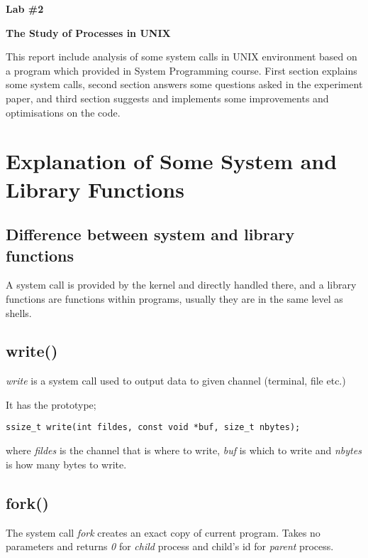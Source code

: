 \documentclass[11pt]{article}
\makeatletter
\renewenvironment{titlepage}
    {%
      \cleardoublepage
      \if@twocolumn
        \@restonecoltrue\onecolumn
      \else
        \@restonecolfalse\newpage
      \fi
      \thispagestyle{empty}%
    }%
    {\if@restonecol\twocolumn \else \newpage \fi
    }
\renewenvironment{titlepage}
    {%
      \cleardoublepage
      \if@twocolumn
        \@restonecoltrue\onecolumn
      \else
        \@restonecolfalse\newpage
      \fi
      \thispagestyle{empty}%
    }%
    {\if@restonecol\twocolumn \else \newpage \fi
     \if@twoside\else
     \fi
    }
\makeatother
\begin{document}
\begin{titlepage}
   \begin{center}
       \vspace*{5cm}
 
       \textbf{ \LARGE Lab \#2}
       
       \vspace{0.5cm}
 	\textbf{The Study of Processes in UNIX}
 	
       \vspace{0.5cm}
This report include analysis of some system calls in UNIX environment based on a program which provided in System Programming course. First section explains some system calls, second section answers some questions asked in the experiment paper, and third section suggests and implements some improvements and optimisations on the code.

 
   \end{center}
\end{titlepage}



\section*{Explanation of Some System and Library Functions}
\subsection*{Difference between system and library functions}
A system call is provided by the kernel and directly handled there, and a library functions are functions within programs, usually they are in the same level as shells.

\subsection*{write()}
\textit{write} is a system call used to output data to given channel (terminal, file etc.)

It has the prototype;

\begin{lstlisting}[frame=tlrb]
ssize_t write(int fildes, const void *buf, size_t nbytes);
\end{lstlisting}

where \textit{fildes} is the channel that is where to write, \textit{buf} is which to write and \textit{nbytes} is how many bytes to write.

\subsection*{fork()}
The system call \textit{fork} creates an exact copy of current program. Takes no parameters and returns \textit{0} for \textit{child} process and child's id for \textit{parent} process.
\end{document}
